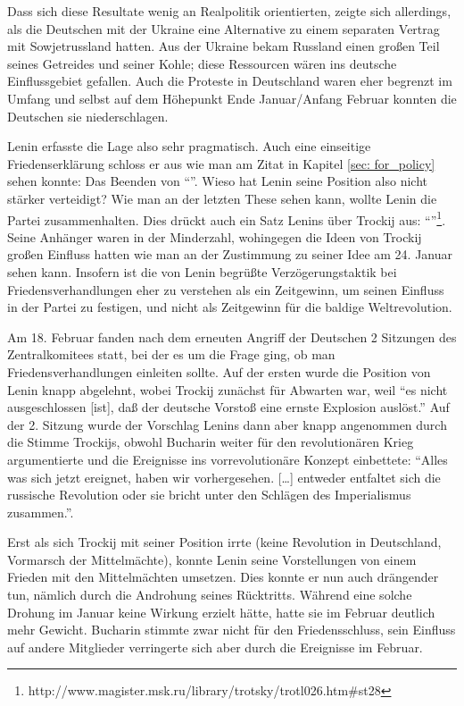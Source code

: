 \documentclass{../../sem_paper}
\begin{document}
Dass sich diese Resultate wenig an Realpolitik orientierten, zeigte sich allerdings, als die Deutschen mit der Ukraine eine Alternative zu einem separaten Vertrag mit Sowjetrussland hatten. Aus der Ukraine bekam Russland einen großen Teil seines Getreides und seiner Kohle; diese Ressourcen wären ins deutsche Einflussgebiet gefallen. Auch die Proteste in Deutschland waren eher begrenzt im Umfang und selbst auf dem Höhepunkt Ende Januar/Anfang Februar konnten die Deutschen sie niederschlagen.

Lenin erfasste die Lage also sehr pragmatisch. Auch eine einseitige Friedenserklärung schloss er aus wie man am Zitat in Kapitel \ref{sec: for_policy} sehen konnte: Das Beenden von "`"'. Wieso hat Lenin seine Position also nicht stärker verteidigt? Wie man an der letzten These sehen kann, wollte Lenin die Partei zusammenhalten. Dies drückt auch ein Satz Lenins über Trockij aus: "`"'\footnote{ http://www.magister.msk.ru/library/trotsky/trotl026.htm\#st28}. Seine Anhänger waren in der Minderzahl, wohingegen die Ideen von Trockij großen Einfluss hatten wie man an der Zustimmung zu seiner Idee am 24. Januar sehen kann. Insofern ist die von Lenin begrüßte Verzögerungstaktik bei Friedensverhandlungen eher zu verstehen als ein Zeitgewinn, um seinen Einfluss in der Partei zu festigen, und nicht als Zeitgewinn für die baldige Weltrevolution\autocite[106]{fels2012}.

Am 18. Februar fanden nach dem erneuten Angriff der Deutschen 2 Sitzungen des Zentralkomitees statt, bei der es um die Frage ging, ob man Friedensverhandlungen einleiten sollte.
Auf der ersten wurde die Position von Lenin knapp abgelehnt, wobei Trockij zunächst für Abwarten war, weil "`es nicht ausgeschlossen [ist], daß der deutsche Vorstoß eine ernste Explosion auslöst."'\autocite[117]{baum1969}
Auf der 2. Sitzung wurde der Vorschlag Lenins dann aber knapp angenommen durch die Stimme Trockijs, obwohl Bucharin weiter für den revolutionären Krieg argumentierte und die Ereignisse ins vorrevolutionäre Konzept einbettete: "`Alles was sich jetzt ereignet, haben wir vorhergesehen. [\ldots] entweder entfaltet sich die russische Revolution oder sie bricht unter den Schlägen des Imperialismus zusammen."'\autocite[119--120]{baum1969}.

Erst als sich Trockij mit seiner Position irrte (keine Revolution in Deutschland, Vormarsch der Mittelmächte), konnte Lenin seine Vorstellungen von einem Frieden mit den Mittelmächten umsetzen. Dies konnte er nun auch drängender tun, nämlich durch die Androhung seines Rücktritts. Während eine solche Drohung im Januar keine Wirkung erzielt hätte, hatte sie im Februar deutlich mehr Gewicht. Bucharin stimmte zwar nicht für den Friedensschluss, sein Einfluss auf andere Mitglieder verringerte sich aber durch die Ereignisse im Februar. 
\end{document}
